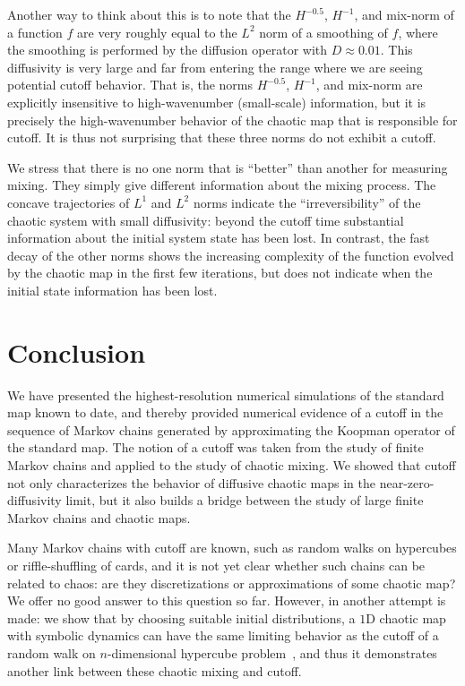 \documentclass{aims}
\theoremstyle{definition}
\begin{document}
Another way to think about this is to note that the $H^{-0.5}$,
$H^{-1}$, and mix-norm of a function $f$ are very roughly equal to the
$L^2$ norm of a smoothing of $f$, where the smoothing is performed by
the diffusion operator with $D \approx 0.01$. This diffusivity is very
large and far from entering the range where we are seeing potential
cutoff behavior. That is, the norms $H^{-0.5}$, $H^{-1}$, and mix-norm
are explicitly insensitive to high-wavenumber (small-scale)
information, but it is precisely the high-wavenumber behavior of the
chaotic map that is responsible for cutoff. It is thus not surprising
that these three norms do not exhibit a cutoff.

We stress that there is no one norm that is ``better'' than another
for measuring mixing. They simply give different information about the
mixing process. The concave trajectories of $L^1$ and $L^2$ norms
indicate the ``irreversibility'' of the chaotic system with small
diffusivity: beyond the cutoff time substantial information about the
initial system state has been lost. In contrast, the fast decay of the
other norms shows the increasing complexity of the function evolved by
the chaotic map in the first few iterations, but does not indicate
when the initial state information has been lost.


\section{Conclusion}
\label{sec:numcutoffconclusion}

We have presented the highest-resolution numerical simulations of the
standard map known to date, and thereby provided numerical evidence of
a cutoff in the sequence of Markov chains generated by approximating
the Koopman operator of the standard map. The notion of a cutoff was taken
from the study of finite Markov chains and applied to the study of
chaotic mixing. We showed that cutoff not only characterizes the
behavior of diffusive chaotic maps in the near-zero-diffusivity limit,
but it also builds a bridge between the study of large finite Markov
chains and chaotic maps.

Many Markov chains with cutoff are known, such as random walks on
hypercubes or riffle-shuffling of cards, and it is not yet clear
whether such chains can be related to chaos: are they discretizations
or approximations of some chaotic map? We offer no good answer to this
question so far. However, in \cite{symdyn} another attempt is made: we
show that by choosing suitable initial distributions, a $1$D chaotic
map with symbolic dynamics can have the same limiting behavior as the
cutoff of a random walk on $n$-dimensional hypercube
problem~\cite{Diaconis1990}, and thus it demonstrates another link
between these chaotic mixing and cutoff.
\end{document}
